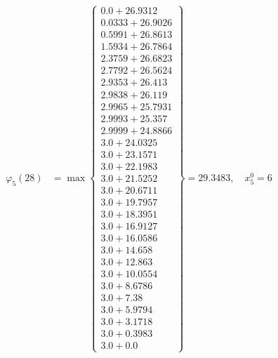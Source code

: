 \documentclass{article}
\begin{document}
\begin{align*}
\varphi_{5}(28) &= \max \left\{ \begin{array}{c}
0.0 + 26.9312 \\
 0.0333 + 26.9026 \\
 0.5991 + 26.8613 \\
 1.5934 + 26.7864 \\
 2.3759 + 26.6823 \\
 2.7792 + 26.5624 \\
 2.9353 + 26.413 \\
 2.9838 + 26.119 \\
 2.9965 + 25.7931 \\
 2.9993 + 25.357 \\
 2.9999 + 24.8866 \\
 3.0 + 24.0325 \\
 3.0 + 23.1571 \\
 3.0 + 22.1983 \\
 3.0 + 21.5252 \\
 3.0 + 20.6711 \\
 3.0 + 19.7957 \\
 3.0 + 18.3951 \\
 3.0 + 16.9127 \\
 3.0 + 16.0586 \\
 3.0 + 14.658 \\
 3.0 + 12.863 \\
 3.0 + 10.0554 \\
 3.0 + 8.6786 \\
 3.0 + 7.38 \\
 3.0 + 5.9794 \\
 3.0 + 3.1718 \\
 3.0 + 0.3983 \\
 3.0 + 0.0
\end{array} \right\}=29.3483, \quad x_{5}^0=6\\
  

\end{align*}
\end{document}
